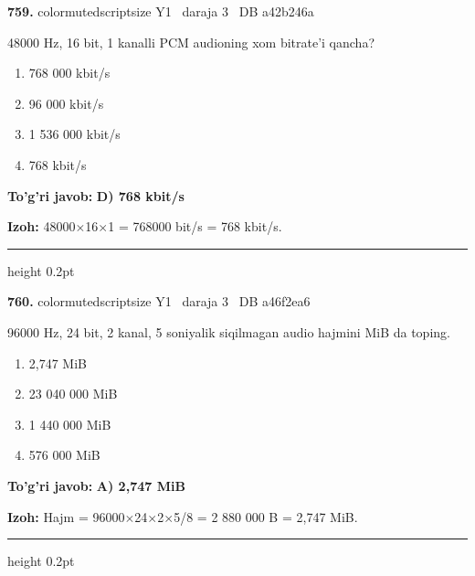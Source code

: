\documentclass[10pt,a4paper,oneside]{article}
\begin{document}
\noindent\textbf{\color{ink}759.}  {color{muted}scriptsize Y1 \textbullet\ daraja 3 \textbullet\ DB a42b246a}
\par
48000 Hz, 16 bit, 1 kanalli PCM audioning xom bitrate'i qancha?
\begin{enumerate}[label=\Alph*),leftmargin=9mm]
\item 768 000 kbit/s
\item 96 000 kbit/s
\item 1 536 000 kbit/s
\item 768 kbit/s
\end{enumerate}
\begin{tcolorbox}[enhanced,breakable,colback=teal!4,colframe=teal!50!black,boxrule=0.5pt,arc=1.1mm,left=3mm,right=3mm,top=1.7mm,bottom=1.7mm,before skip=2mm,after skip=2mm]
\textbf{\color{teal}To'g'ri javob:} \textbf{D) 768 kbit/s}
\par\smallskip
\textbf{Izoh:} 48000\ensuremath{\times}16\ensuremath{\times}1 = 768000 bit/s = 768 kbit/s.
\end{tcolorbox}
\vspace{2mm}\hrule height 0.2pt \vspace{3mm}

\noindent\textbf{\color{ink}760.}  {color{muted}scriptsize Y1 \textbullet\ daraja 3 \textbullet\ DB a46f2ea6}
\par
96000 Hz, 24 bit, 2 kanal, 5 soniyalik siqilmagan audio hajmini MiB da toping.
\begin{enumerate}[label=\Alph*),leftmargin=9mm]
\item 2,747 MiB
\item 23 040 000 MiB
\item 1 440 000 MiB
\item 576 000 MiB
\end{enumerate}
\begin{tcolorbox}[enhanced,breakable,colback=teal!4,colframe=teal!50!black,boxrule=0.5pt,arc=1.1mm,left=3mm,right=3mm,top=1.7mm,bottom=1.7mm,before skip=2mm,after skip=2mm]
\textbf{\color{teal}To'g'ri javob:} \textbf{A) 2,747 MiB}
\par\smallskip
\textbf{Izoh:} Hajm = 96000\ensuremath{\times}24\ensuremath{\times}2\ensuremath{\times}5/8 = 2 880 000 B = 2,747 MiB.
\end{tcolorbox}
\vspace{2mm}\hrule height 0.2pt \vspace{3mm}
\end{document}
